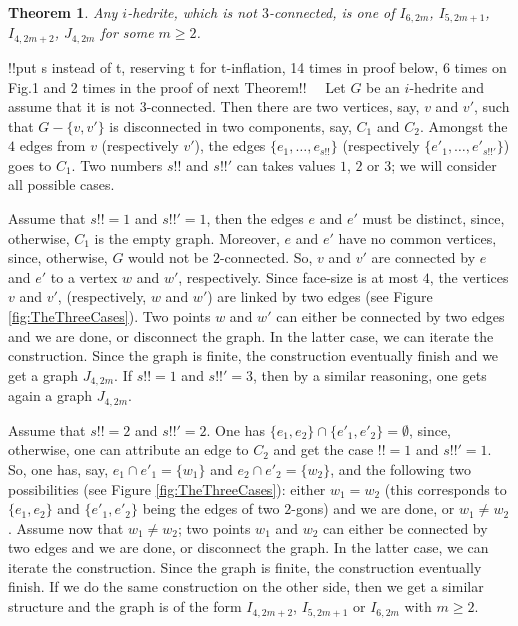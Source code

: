 \documentclass[12pt]{article}
\newtheorem{theorem}{Theorem}
\newcommand{\proof}{\noindent{\bf Proof.}\ \ }
\begin{document}
\begin{theorem}\label{3-connectedness}
Any $i$-hedrite, which is not $3$-connected, is one of $I_{6,2m}$, $I_{5, 2m+1}$, $I_{4, 2m+2}$, $J_{4, 2m}$ for some $m\geq 2$.


\end{theorem}
!!put s instead of t, reserving t for t-inflation, 14 times in proof below,
6 times on Fig.1 and 2 times in the proof of next Theorem!!
\proof Let $G$ be an $i$-hedrite and assume that it is not $3$-connected. 
Then there are two vertices, say, $v$ and $v'$, such that 
$G-\{v, v'\}$ is disconnected in two components, say, $C_1$ and $C_2$.
Amongst the $4$ edges from $v$ (respectively $v'$), the edges 
$\{e_1,\dots, e_{s!!}\}$ (respectively $\{e'_1,\dots, e'_{s!!'}\}$) goes
to $C_1$. Two numbers $s!!$ and $s!!'$ can takes values $1$, $2$ or $3$; we
will consider all possible cases.

Assume that $s!!=1$ and $s!!'=1$, then the edges $e$ and $e'$ must be
distinct, since, otherwise, $C_1$ is the empty graph. Moreover, $e$ and
$e'$ have no common vertices, since, otherwise, $G$ would not be $2$-connected.
So, $v$ and $v'$ are connected by $e$ and $e'$ to a vertex $w$ and $w'$,
respectively. Since face-size is at most $4$, the vertices $v$ and $v'$,
(respectively, $w$ and $w'$) are linked by two edges
(see Figure \ref{fig:TheThreeCases}).
Two points $w$ and $w'$ can either be connected by two edges and
we are done, or disconnect the graph. In the latter case, we can iterate
the construction. Since the graph is finite, the construction eventually
finish and we get a graph $J_{4,2m}$. If $s!!=1$ and
$s!!'=3$, then by a similar reasoning, one gets again a graph $J_{4,2m}$.

Assume that $s!!=2$ and $s!!'=2$. One has $\{e_1, e_2\}\cap \{e'_1, e'_2\}=\emptyset$, since, otherwise, one can attribute an edge to $C_2$ and get the case
$!!=1$ and $s!!'=1$. So, one has, say, $e_1\cap e'_1=\{w_1\}$ and 
$e_2\cap e'_2=\{w_2\}$, and the following two possibilities 
(see Figure \ref{fig:TheThreeCases}): either $w_1=w_2$ (this
corresponds to $\{e_1, e_2\}$ and $\{e'_1, e'_2\}$ being the edges
of two $2$-gons) and we are done, or $w_1\not= w_2$.
Assume now that $w_1\not= w_2$; two points $w_1$ and $w_2$ can 
either be connected by two edges and we are done, or disconnect the
graph. In the latter case, we can iterate the construction. Since the 
graph is finite, the construction eventually finish. If we do the same
construction on the other side, then we get a similar structure and the 
graph is of the form $I_{4,2m+2}$, $I_{5, 2m+1}$ or $I_{6,2m}$ with 
$m\geq 2$.
\end{document}
